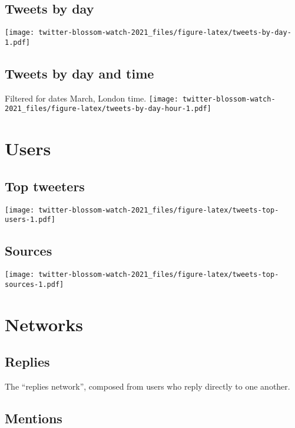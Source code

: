\documentclass[
]{article}
\begin{document}
\hypertarget{tweets-by-day}{%
\subsection{Tweets by day}\label{tweets-by-day}}

\texttt{[image: twitter-blossom-watch-2021\_files/figure-latex/tweets-by-day-1.pdf]}

\hypertarget{tweets-by-day-and-time}{%
\subsection{Tweets by day and time}\label{tweets-by-day-and-time}}

Filtered for dates March, London time.
\texttt{[image: twitter-blossom-watch-2021\_files/figure-latex/tweets-by-day-hour-1.pdf]}

\hypertarget{users}{%
\section{Users}\label{users}}

\hypertarget{top-tweeters}{%
\subsection{Top tweeters}\label{top-tweeters}}

\texttt{[image: twitter-blossom-watch-2021\_files/figure-latex/tweets-top-users-1.pdf]}

\hypertarget{sources}{%
\subsection{Sources}\label{sources}}

\texttt{[image: twitter-blossom-watch-2021\_files/figure-latex/tweets-top-sources-1.pdf]}

\hypertarget{networks}{%
\section{Networks}\label{networks}}

\hypertarget{replies}{%
\subsection{Replies}\label{replies}}

The ``replies network'', composed from users who reply directly to one
another.

\hypertarget{mentions}{%
\subsection{Mentions}\label{mentions}}
\end{document}
